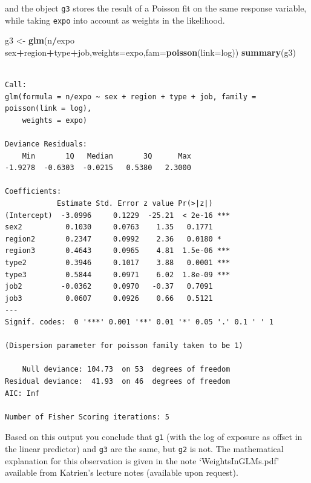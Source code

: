 \documentclass[
]{book}
\newenvironment{Shaded}{\begin{snugshade}}{\end{snugshade}}
\newcommand{\DataTypeTok}[1]{\textcolor[rgb]{0.13,0.29,0.53}{#1}}
\newcommand{\KeywordTok}[1]{\textcolor[rgb]{0.13,0.29,0.53}{\textbf{#1}}}
\newcommand{\NormalTok}[1]{#1}
\newcommand{\OperatorTok}[1]{\textcolor[rgb]{0.81,0.36,0.00}{\textbf{#1}}}
\newcommand{\StringTok}[1]{\textcolor[rgb]{0.31,0.60,0.02}{#1}}
\begin{document}
and the object \texttt{g3} stores the result of a Poisson fit on the same response variable, while taking \texttt{expo} into account as weights in the likelihood.

\begin{Shaded}
\begin{Highlighting}[]
\NormalTok{g3 <-}\StringTok{ }\KeywordTok{glm}\NormalTok{(n}\OperatorTok{/}\NormalTok{expo }\OperatorTok{~}\StringTok{ }\NormalTok{sex}\OperatorTok{+}\NormalTok{region}\OperatorTok{+}\NormalTok{type}\OperatorTok{+}\NormalTok{job,}\DataTypeTok{weights=}\NormalTok{expo,}\DataTypeTok{fam=}\KeywordTok{poisson}\NormalTok{(}\DataTypeTok{link=}\NormalTok{log))}
\KeywordTok{summary}\NormalTok{(g3)}
\end{Highlighting}
\end{Shaded}

\begin{verbatim}

Call:
glm(formula = n/expo ~ sex + region + type + job, family = poisson(link = log), 
    weights = expo)

Deviance Residuals: 
    Min       1Q   Median       3Q      Max  
-1.9278  -0.6303  -0.0215   0.5380   2.3000  

Coefficients:
            Estimate Std. Error z value Pr(>|z|)    
(Intercept)  -3.0996     0.1229  -25.21  < 2e-16 ***
sex2          0.1030     0.0763    1.35   0.1771    
region2       0.2347     0.0992    2.36   0.0180 *  
region3       0.4643     0.0965    4.81  1.5e-06 ***
type2         0.3946     0.1017    3.88   0.0001 ***
type3         0.5844     0.0971    6.02  1.8e-09 ***
job2         -0.0362     0.0970   -0.37   0.7091    
job3          0.0607     0.0926    0.66   0.5121    
---
Signif. codes:  0 '***' 0.001 '**' 0.01 '*' 0.05 '.' 0.1 ' ' 1

(Dispersion parameter for poisson family taken to be 1)

    Null deviance: 104.73  on 53  degrees of freedom
Residual deviance:  41.93  on 46  degrees of freedom
AIC: Inf

Number of Fisher Scoring iterations: 5
\end{verbatim}

Based on this output you conclude that \texttt{g1} (with the log of exposure as offset in the linear predictor) and \texttt{g3} are the same, but \texttt{g2} is not. The mathematical explanation for this observation is given in the note `WeightsInGLMs.pdf' available from Katrien's lecture notes (available upon request).
\end{document}
